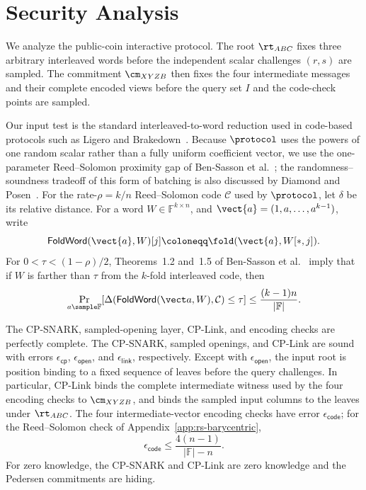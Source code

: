 \section{Security Analysis}
\label{sec:security}

We analyze the public-coin interactive protocol.  The root \(\rt_{ABC}\)
fixes three arbitrary interleaved words before the independent scalar
challenges \((r,s)\) are sampled.  The commitment \(\cm_{XYZB}\) then fixes
the four intermediate messages and their complete encoded views before the
query set \(I\) and the code-check points are sampled.

Our input test is the standard interleaved-to-word reduction used in
code-based protocols such as Ligero and
Brakedown~\cite{ames2017ligero,golovnev2023brakedown}.  Because \(\protocol\)
uses the powers of one random scalar rather than a fully uniform coefficient
vector, we use the one-parameter Reed--Solomon proximity gap of
Ben-Sasson et al.~\cite[Theorem~1.5]{bensasson2023proximity}; the
randomness--soundness tradeoff of this form of batching is also discussed
by Diamond and Posen~\cite{diamond2024logarithmic}.
For the rate-\(\rho=k/n\) Reed--Solomon code \(\mathcal C\) used by
\(\protocol\), let \(\delta\) be its relative distance.  For a word
\(W\in\mathbb{F}^{k\times n}\), and
\(\vect{a}=(1,a,\ldots,a^{k-1})\), write
\[
  \mathsf{FoldWord}(\vect{a},W)[j]
  \coloneqq \fold(\vect{a},W[*,j]).
\]
For \(0<\tau<(1-\rho)/2\), Theorems~1.2 and~1.5 of
Ben-Sasson et al.~\cite{bensasson2023proximity} imply that if \(W\) is farther
than \(\tau\) from the \(k\)-fold interleaved code, then
\[
  \Pr_{a\sample\mathbb F}\!\left[
    \Delta(\mathsf{FoldWord}(\vect a,W),\mathcal C)\le\tau
  \right]
  \le \frac{(k-1)n}{|\mathbb F|}.
\]
\begin{definition}
\label{def:lamp-backend-assumptions}
The CP-SNARK, sampled-opening layer, CP-Link, and encoding checks are perfectly
complete.  The CP-SNARK, sampled openings, and CP-Link are sound with errors
\(\epsilon_{\mathsf{cp}}\), \(\epsilon_{\mathsf{open}}\), and
\(\epsilon_{\mathsf{link}}\), respectively.  Except with
\(\epsilon_{\mathsf{open}}\), the input root is position binding to a fixed
sequence of leaves before the query challenges.  In particular, CP-Link binds the
complete intermediate witness used by the four encoding checks to
\(\cm_{XYZB}\), and binds the sampled input columns to the leaves under
\(\rt_{ABC}\).  The four intermediate-vector encoding checks have error
\(\epsilon_{\mathsf{code}}\); for the Reed--Solomon check of
Appendix~\ref{app:rs-barycentric},
\[
  \epsilon_{\mathsf{code}}
  \le \frac{4(n-1)}{|\mathbb{F}|-n}.
\]
For zero knowledge, the CP-SNARK and CP-Link are zero knowledge and the
Pedersen commitments are hiding.
\end{definition}

